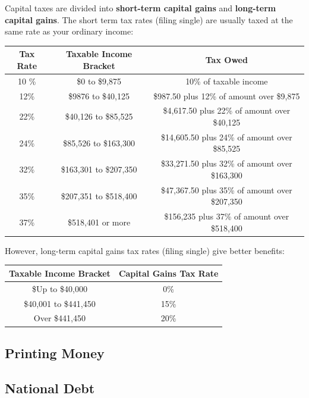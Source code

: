 \documentclass{article}
\begin{document}
    \begin{example}
      \label{ex:2020-capital-gains-tax-rates}
      Capital taxes are divided into \textbf{short-term capital gains} and \textbf{long-term capital gains}. The short term tax rates (filing single) are usually taxed at the same rate as your ordinary income:
      \begin{center}
      \begin{tabular}{c|c|c}
          Tax Rate & Taxable Income Bracket & Tax Owed \\
          \hline
          10 \% & \$0 to \$9,875 & 10\% of taxable income \\
          12\% & \$9876 to \$40,125 & \$987.50 plus 12\% of amount over \$9,875\\
          22\% & \$40,126 to \$85,525 & \$4,617.50 plus 22\% of amount over \$40,125\\
          24\% & \$85,526 to \$163,300 & \$14,605.50 plus 24\% of amount over \$85,525\\
          32\% & \$163,301 to \$207,350 & \$33,271.50 plus 32\% of amount over \$163,300\\
          35\% & \$207,351 to \$518,400 & \$47,367.50 plus 35\% of amount over \$207,350\\
          37\% & \$518,401 or more & \$156,235 plus 37\% of amount over \$518,400
      \end{tabular}
      \end{center}
      However, long-term capital gains tax rates (filing single) give better benefits: 
      \begin{center}
      \begin{tabular}{c|c}
          Taxable Income Bracket & Capital Gains Tax Rate\\
          \hline
          \$Up to \$40,000 & 0\% \\
          \$40,001 to \$441,450 & 15\% \\
          Over \$441,450 & 20\% 
      \end{tabular}
      \end{center}
    \end{example}

  \subsection{Printing Money}


  \subsection{National Debt}
\end{document}
